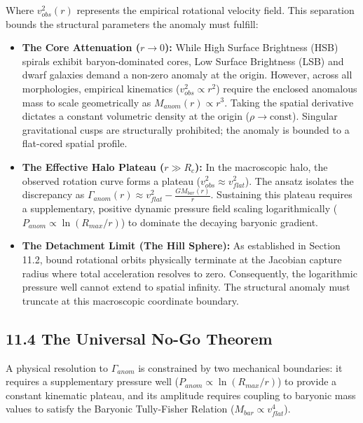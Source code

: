 Where $v_{obs}^2(r)$ represents the empirical rotational velocity field. This separation bounds the structural parameters the anomaly must fulfill: 
\begin{itemize} 
    \item \textbf{The Core Attenuation ($r \to 0$):} While High Surface Brightness (HSB) spirals exhibit baryon-dominated cores, Low Surface Brightness (LSB) and dwarf galaxies demand a non-zero anomaly at the origin. However, across all morphologies, empirical kinematics ($v_{obs}^2 \propto r^2$) require the enclosed anomalous mass to scale geometrically as $M_{anom}(r) \propto r^3$. Taking the spatial derivative dictates a constant volumetric density at the origin ($\rho \to \text{const}$). Singular gravitational cusps are structurally prohibited; the anomaly is bounded to a flat-cored spatial profile. 
    \item \textbf{The Effective Halo Plateau ($r \gg R_c$):} In the macroscopic halo, the observed rotation curve forms a plateau ($v_{obs}^2 \approx v_{flat}^2$). The ansatz isolates the discrepancy as $\Gamma_{anom}(r) \approx v_{flat}^2 - \frac{GM_{bar}(r)}{r}$. Sustaining this plateau requires a supplementary, positive dynamic pressure field scaling logarithmically ($P_{anom} \propto \ln(R_{max}/r)$) to dominate the decaying baryonic gradient. 
    \item \textbf{The Detachment Limit (The Hill Sphere):} As established in Section 11.2, bound rotational orbits physically terminate at the Jacobian capture radius where total acceleration resolves to zero. Consequently, the logarithmic pressure well cannot extend to spatial infinity. The structural anomaly must truncate at this macroscopic coordinate boundary.
\end{itemize}

\subsection*{11.4 The Universal No-Go Theorem} 
A physical resolution to $\Gamma_{anom}$ is constrained by two mechanical boundaries: it requires a supplementary pressure well ($P_{anom} \propto \ln(R_{max}/r)$) to provide a constant kinematic plateau, and its amplitude requires coupling to baryonic mass values to satisfy the Baryonic Tully-Fisher Relation ($M_{bar} \propto v_{flat}^4$).

